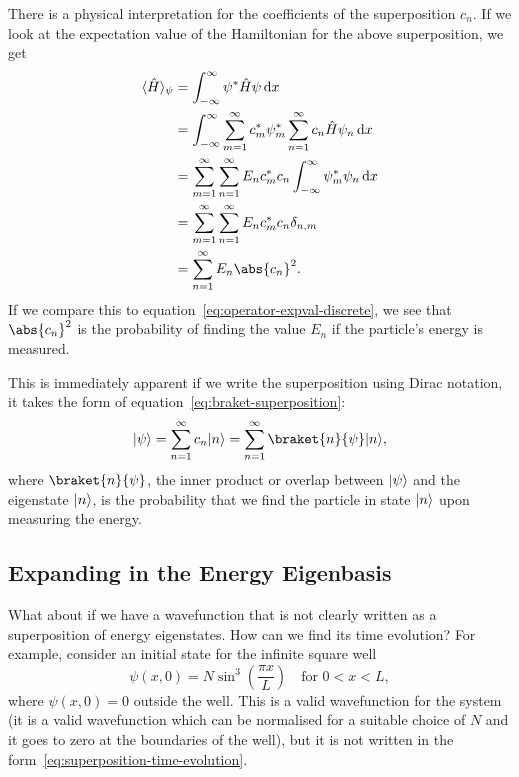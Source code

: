 \documentclass[../quantum_mechanics.tex]{subfiles}
\begin{document}
            There is a physical interpretation for the coefficients of the superposition $c_n$.
            If we look at the expectation value of the Hamiltonian for the above superposition, we get
            \begin{align}
                \langle\hat{H}\rangle_\psi&=\int_{-\infty}^\infty\psi^\ast\hat{H}\psi\dd{x}\\
                &=\int_{-\infty}^\infty\sum_{m=1}^\infty c_m^\ast\psi_m^\ast\sum_{n=1}^\infty c_n\hat{H}\psi_n\dd{x}\\
                &=\sum_{m=1}^\infty\sum_{n=1}^\infty E_nc_m^\ast c_n\int_{-\infty}^\infty\psi_m^\ast\psi_n\dd{x}\\
                &=\sum_{m=1}^\infty\sum_{n=1}^\infty E_nc_m^\ast c_n\delta_{n,m}\\
                &=\sum_{n=1}^\infty E_n\abs{c_n}^2.
            \end{align}
            If we compare this to equation~\ref{eq:operator-expval-discrete}, we see that $\abs{c_n}^2$ is the probability of finding the value $E_n$ if the particle's energy is measured. 

            This is immediately apparent if we write the superposition using Dirac notation, it takes the form of equation~\ref{eq:braket-superposition}:
            \begin{equation}\label{eq:isw-braket-superposition}
                \ket{\psi}=\sum_{n=1}^\infty c_n\ket{n}=\sum_{n=1}^\infty\braket{n}{\psi}\ket{n},
            \end{equation}
            where $\braket{n}{\psi}$, the inner product or overlap between $\lvert\psi\rangle$ and the eigenstate $\lvert n\rangle$, is the probability that we find the particle in state $\lvert n\rangle$ upon measuring the energy.

        \subsection{Expanding in the Energy Eigenbasis}\label{sec:properties-of-energy-eigenstates:subsec:expanding-in-the-energy-eigenbasis}
            What about if we have a wavefunction that is not clearly written as a superposition of energy eigenstates.
            How can we find its time evolution?
            For example, consider an initial state for the infinite square well
            \begin{equation}
                \psi(x,0)=N\sin^3\left(\frac{\pi x}{L}\right)\quad\text{for }0<x<L,
            \end{equation}
            where $\psi(x,0)=0$ outside the well.
            This is a valid wavefunction for the system (it is a valid wavefunction which can be normalised for a suitable choice of $N$ and it goes to zero at the boundaries of the well), but it is not written in the form~\ref{eq:superposition-time-evolution}.
            
\end{document}
